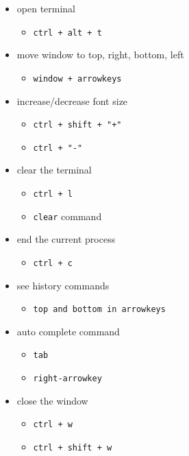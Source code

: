 \documentclass[
]{article}
\providecommand{\tightlist}{%
  \setlength{\itemsep}{0pt}\setlength{\parskip}{0pt}}
\begin{document}
\begin{itemize}
\tightlist
\item
  open terminal

  \begin{itemize}
  \tightlist
  \item
    \texttt{ctrl\ +\ alt\ +\ t}
  \end{itemize}
\item
  move window to top, right, bottom, left

  \begin{itemize}
  \tightlist
  \item
    \texttt{window\ +\ arrowkeys}
  \end{itemize}
\item
  increase/decrease font size

  \begin{itemize}
  \tightlist
  \item
    \texttt{ctrl\ +\ shift\ +\ "+"}
  \item
    \texttt{ctrl\ +\ "-"}
  \end{itemize}
\item
  clear the terminal

  \begin{itemize}
  \tightlist
  \item
    \texttt{ctrl\ +\ l}
  \item
    \texttt{clear} command
  \end{itemize}
\item
  end the current process

  \begin{itemize}
  \tightlist
  \item
    \texttt{ctrl\ +\ c}
  \end{itemize}
\item
  see history commands

  \begin{itemize}
  \tightlist
  \item
    \texttt{top\ and\ bottom\ in\ arrowkeys}
  \end{itemize}
\item
  auto complete command

  \begin{itemize}
  \tightlist
  \item
    \texttt{tab}
  \item
    \texttt{right-arrowkey}
  \end{itemize}
\item
  close the window

  \begin{itemize}
  \tightlist
  \item
    \texttt{ctrl\ +\ w}
  \item
    \texttt{ctrl\ +\ shift\ +\ w}
  \end{itemize}
\end{itemize}
\end{document}
